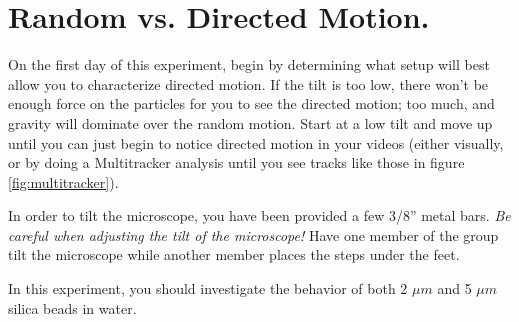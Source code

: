 \section{Random vs. Directed Motion.}
On the first day of this experiment, begin by determining what setup will best allow you to characterize directed motion. 
If the tilt is too low, there won't be enough force on the particles for you to see the directed motion; too much, and gravity will dominate over the random motion.
Start at a low tilt and move up until you can just begin to notice directed motion in your videos (either visually, or by doing a Multitracker analysis until you see tracks like those in figure \ref{fig:multitracker}).
\par
In order to tilt the microscope, you have been provided a few 3/8'' metal bars. 
\emph{Be careful when adjusting the tilt of the microscope!}
Have one member of the group tilt the microscope while another member places the steps under the feet.
\par 
In this experiment, you should investigate the behavior of both 2 $\mu m$ and 5 $\mu m$ silica beads in water.


